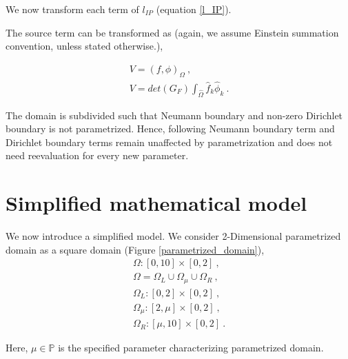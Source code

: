\documentclass[a4paper,oneside,openright,spanish,english]{book}
\begin{document}
We now transform each term of $l_{IP}$ (equation \eqref{l_IP}).

The source term can be transformed as (again, we assume Einstein summation convention, unless stated otherwise.),

\begin{equation}\label{affine_source_term}
\begin{split}
V = (f,\phi)_{\Omega} \ , \\
V = det(G_F) \int_{\hat{\Omega}} \hat{f}_k \hat{\phi}_k \ .
\end{split}
\end{equation}

The domain is subdivided such that Neumann boundary and non-zero Dirichlet boundary is not parametrized. Hence, following Neumann boundary term and Dirichlet boundary terms remain unaffected by parametrization and does not need reevaluation for every new parameter.

\section{Simplified mathematical model}

We now introduce a simplified model. We consider 2-Dimensional parametrized domain as a square domain (Figure \ref{parametrized_domain}),
\begin{equation}
\begin{split}
\Omega : [0,10] \times [0,2] \ , \\
\Omega = \Omega_L \cup \Omega_{\mu} \cup \Omega_R \ , \\
\Omega_L : [0,2] \times [0,2] \ , \\
\Omega_{\mu} : [2,\mu] \times [0,2] \ , \\
\Omega_R : [\mu,10] \times [0,2] \ .
\end{split}
\end{equation}

Here, $\mu \in \mathbb{P}$ is the specified parameter characterizing parametrized domain.
\end{document}
